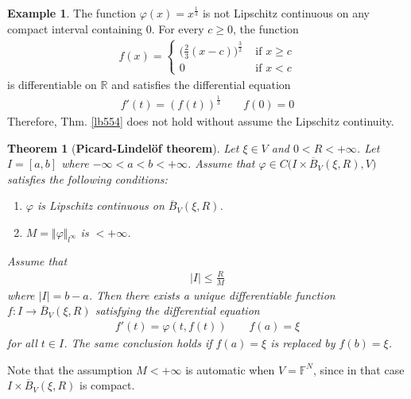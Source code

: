 \documentclass[12pt,b5paper,notitlepage]{article}
\theoremstyle{definition}
\newtheorem{eg}[df]{Example}
\theoremstyle{plain}
\newtheorem{thm}[df]{Theorem}
\newcommand{\ovl}{\overline}
\newcommand{\Rbb}{\mathbb R}
\newcommand{\Fbb}{\mathbb F}
\numberwithin{equation}{section}
\begin{document}
\begin{eg}
The function $\varphi(x)=x^{\frac 13}$ is not Lipschitz continuous on any compact interval containing $0$. For every $c\geq0$, the function
\begin{align*}
f(x)=\left\{
\begin{array}{ll}
\big(\frac 23(x-c)\big)^{\frac 32}&\text{ if }x\geq c\\[1ex]
0 &\text{ if }x<c
\end{array}
\right.
\end{align*}
is differentiable on $\Rbb$ and satisfies the differential equation
\begin{align*}
f'(t)=(f(t))^{\frac 13}\qquad f(0)=0
\end{align*}
Therefore, Thm. \ref{lb554} does not hold without assume the Lipschitz continuity.
\end{eg}



\begin{thm}[\textbf{Picard-Lindel\"of theorem}]\label{lb556}
Let $\xi\in V$ and $0<R<+\infty$. Let $I=[a,b]$ where $-\infty<a<b<+\infty$. Assume that $\varphi \in C\big(I\times\ovl B_V(\xi,R),V\big)$ satisfies the following conditions:
\begin{enumerate}[label=(\arabic*)]
\item $\varphi$ is Lipschitz continuous on $\ovl B_V(\xi,R)$.
\item $M=\Vert\varphi\Vert_{l^\infty}$ is $<+\infty$.
\end{enumerate}
Assume that 
\begin{align}
|I|\leq \frac RM  \label{eq219}
\end{align} 
where $|I|=b-a$. Then there exists a unique differentiable function $f:I\rightarrow \ovl B_V(\xi,R)$ satisfying the differential equation
\begin{align}
f'(t)=\varphi(t,f(t))\qquad f(a)=\xi  \label{eq218}
\end{align}
for all $t\in I$. The same conclusion holds if $f(a)=\xi$ is replaced by $f(b)=\xi$.
\end{thm}


Note that the assumption $M<+\infty$ is automatic when $V=\Fbb^N$, since in that case $I\times\ovl B_V(\xi,R)$ is compact.  
\end{document}
